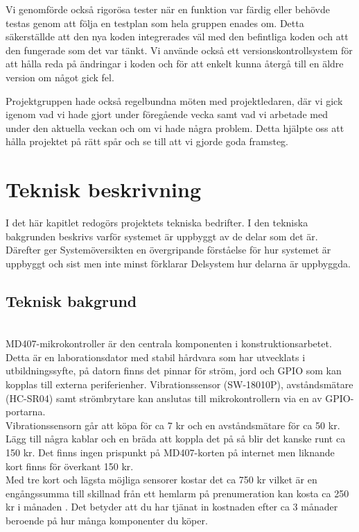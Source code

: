 \documentclass{article}
\begin{document}
Vi genomförde också rigorösa tester när en funktion var färdig eller behövde testas genom att följa en testplan som hela gruppen enades om. 
Detta säkerställde att den nya koden integrerades väl med den befintliga koden och att den fungerade som det var tänkt.
Vi använde också ett versionskontrollsystem för att hålla reda på ändringar i koden och för att enkelt kunna återgå till en äldre version om något gick fel.

Projektgruppen hade också regelbundna möten med projektledaren,
där vi gick igenom vad vi hade gjort under föregående vecka samt vad vi arbetade med under den aktuella veckan och om vi hade några problem.
Detta hjälpte oss att hålla projektet på rätt spår och se till att vi gjorde goda framsteg.

\newpage
\section{Teknisk beskrivning}
I det här kapitlet redogörs projektets tekniska bedrifter. 
I den tekniska bakgrunden beskrivs varför systemet är uppbyggt av de delar som det är.
Därefter ger Systemöversikten en övergripande förståelse för hur systemet är uppbyggt och sist men inte minst förklarar Delsystem hur delarna är uppbyggda.


\subsection{Teknisk bakgrund}\\

MD407-mikrokontroller är den centrala komponenten i konstruktionsarbetet. 
Detta är en laborationsdator med stabil hårdvara som har utvecklats i utbildningssyfte, på datorn finns det pinnar för ström, jord och GPIO som kan kopplas till externa periferienher.
Vibrationssensor (SW-18010P), avståndsmätare (HC-SR04) samt strömbrytare kan anslutas till mikrokontrollern via en av GPIO-portarna.\\

Vibrationssensorn går att köpa för ca 7 kr och en avståndsmätare för ca 50 kr.
Lägg till några kablar och en bräda att koppla det på så blir det kanske runt ca 150 kr. 
Det finns ingen prispunkt på MD407-korten på internet men liknande kort finns för överkant 150 kr.\\

Med tre kort och lägsta möjliga sensorer kostar det ca 750 kr vilket är en engångssumma till skillnad från ett hemlarm på prenumeration kan kosta ca 250 kr i månaden \cite{Offerta}.
Det betyder att du har tjänat in kostnaden efter ca 3 månader beroende på hur många komponenter du köper.\\
\end{document}
